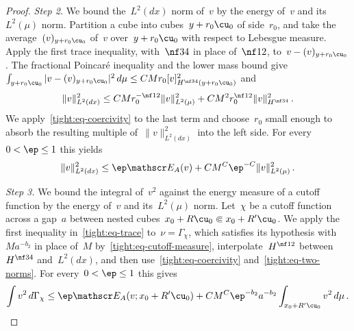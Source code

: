 \documentclass[11pt]{amsart}
\begin{document}
\begin{proof}
\smallskip

\emph{Step 2.} We bound the~$L^2(dx)$ norm of~$v$ by the energy of~$v$ and its~$L^2(\mu)$ norm. Partition a cube into cubes~$y+r_0\cu_0$ of side~$r_0$, and take the average~$(v)_{y+r_0\cu_0}$ of~$v$ over~$y+r_0\cu_0$ with respect to Lebesgue measure. Apply the first trace inequality, with~$\nf34$ in place of~$\nf12$, to~$v-(v)_{y+r_0\cu_0}$. The fractional Poincar\'e inequality and the lower mass bound give~$\int_{y+r_0\cu_0}|v-(v)_{y+r_0\cu_0}|^2\,d\mu\leq CMr_0[v]_{H^{\nf34}(y+r_0\cu_0)}^2$ and
\begin{equation*}
	\|v\|_{L^2(dx)}^2
	\leq CMr_0^{-\nf12}\|v\|_{L^2(\mu)}^2
	+CM^2r_0^{\nf12}\|v\|_{H^{\nf34}}^2\,.
\end{equation*}
We apply~\eqref{tight:eq-coercivity} to the last term and choose~$r_0$ small enough to absorb the resulting multiple of~$\|v\|_{L^2(dx)}^2$ into the left side. For every~$0<\ep\leq1$ this yields
\begin{equation}
	\|v\|_{L^2(dx)}^2
	\leq\ep\mathscr E_A(v)
	+CM^C\ep^{-C}\|v\|_{L^2(\mu)}^2\,.
	\label{tight:eq-two-norms}
\end{equation}

\smallskip

\emph{Step 3.} We bound the integral of~$v^2$ against the energy measure of a cutoff function by the energy of~$v$ and its~$L^2(\mu)$ norm. Let~$\chi$ be a cutoff function across a gap~$a$ between nested cubes~$x_0+R\cu_0\Subset x_0+R'\cu_0$. We apply the first inequality in~\eqref{tight:eq-trace} to~$\nu=\Gamma_\chi$, which satisfies its hypothesis with~$Ma^{-b_2}$ in place of~$M$ by~\eqref{tight:eq-cutoff-measure}, interpolate~$H^{\nf12}$ between~$H^{\nf34}$ and~$L^2(dx)$, and then use~\eqref{tight:eq-coercivity} and~\eqref{tight:eq-two-norms}. For every~$0<\ep\leq1$ this gives
\begin{equation}
	\int v^2\,d\Gamma_\chi
	\leq\ep\mathscr E_A(v;x_0+R'\cu_0)
	+CM^C\ep^{-b_2}a^{-b_2}\int_{x_0+R'\cu_0} v^2\,d\mu\,.
	\label{tight:eq-cutoff-form}
\end{equation}

\smallskip


\end{proof}
\end{document}
